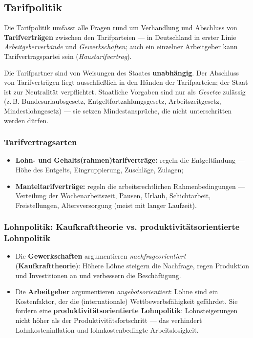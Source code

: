 \documentclass[11pt, a4paper]{article}
\begin{document}
\subsection{Tarifpolitik}

Die Tarifpolitik umfasst alle Fragen rund um Verhandlung und Abschluss von
\textbf{Tarifverträgen} zwischen den Tarifparteien --- in Deutschland in erster Linie
\emph{Arbeitgeberverbände} und \emph{Gewerkschaften}; auch ein einzelner Arbeitgeber kann
Tarifvertragspartei sein (\emph{Haustarifvertrag}).

\begin{merksatz}[title={\bfseries Tarifautonomie (Art. 9 Abs. 3 GG)}]
Die Tarifpartner sind von Weisungen des Staates \textbf{unabhängig}. Der Abschluss von
Tarifverträgen liegt ausschließlich in den Händen der Tarifparteien; der Staat ist zur
Neutralität verpflichtet. Staatliche Vorgaben sind nur als \emph{Gesetze} zulässig
(z.\,B. Bundesurlaubsgesetz, Entgeltfortzahlungsgesetz, Arbeitszeitgesetz,
Mindestlohngesetz) --- sie setzen Mindestansprüche, die nicht unterschritten werden dürfen.
\end{merksatz}

\subsubsection{Tarifvertragsarten}

\begin{itemize}
  \item \textbf{Lohn- und Gehalts(rahmen)tarifverträge:} regeln die Entgeltfindung ---
    Höhe des Entgelts, Eingruppierung, Zuschläge, Zulagen;
  \item \textbf{Manteltarifverträge:} regeln die arbeitsrechtlichen Rahmenbedingungen ---
    Verteilung der Wochenarbeitszeit, Pausen, Urlaub, Schichtarbeit, Freistellungen,
    Altersversorgung (meist mit langer Laufzeit).
\end{itemize}

\subsubsection{Lohnpolitik: Kaufkrafttheorie vs. produktivitätsorientierte Lohnpolitik}

\begin{itemize}
  \item Die \textbf{Gewerkschaften} argumentieren \emph{nachfrageorientiert}
    (\textbf{Kaufkrafttheorie}): Höhere Löhne steigern die Nachfrage, regen Produktion und
    Investitionen an und verbessern die Beschäftigung.
  \item Die \textbf{Arbeitgeber} argumentieren \emph{angebotsorientiert}: Löhne sind ein
    Kostenfaktor, der die (internationale) Wettbewerbsfähigkeit gefährdet. Sie fordern eine
    \textbf{produktivitätsorientierte Lohnpolitik}: Lohnsteigerungen nicht höher als der
    Produktivitätsfortschritt --- das verhindert Lohnkosteninflation und lohnkostenbedingte
    Arbeitslosigkeit.
\end{itemize}
\end{document}
